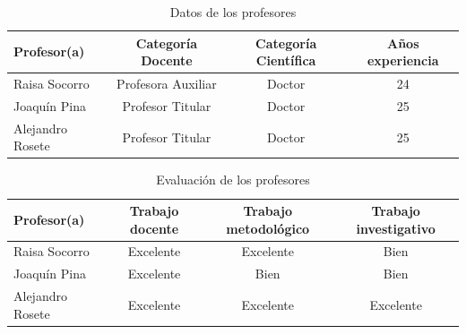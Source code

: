\begin{table}[H]
	\centering
	\caption{Datos de los profesores}\label{datos-prof1}
		\begin{tabular}{l c c c }
			\toprule[1.7pt]
		Profesor(a) & Categoría Docente  & Categoría Científica & Años experiencia \\ \midrule
			Raisa Socorro                             & Profesora Auxiliar & Doctor               & 24               \\
		\rowcolor{gray!30}	Joaquín Pina                              & Profesor Titular   & Doctor               & 25               \\
			Alejandro Rosete                          & Profesor Titular   & Doctor               & 25               \\
			\bottomrule[1pt]            
		\end{tabular}
\end{table}

\begin{table}[H]
	\caption{Evaluación de los profesores}\label{datos-prof2}
	\centering
	\begin{tabular}{l c c c}
		\toprule[1.7pt]
		Profesor(a) & Trabajo docente & Trabajo metodológico & Trabajo investigativo \\ \midrule
		Raisa Socorro                             & Excelente       & Excelente            & Bien                  \\
		\rowcolor{gray!30} Joaquín Pina                              & Excelente       & Bien                 & Bien                  \\
		Alejandro Rosete                          & Excelente       & Excelente            & Excelente             \\
	\bottomrule[1pt]        
	\end{tabular}
\end{table}




